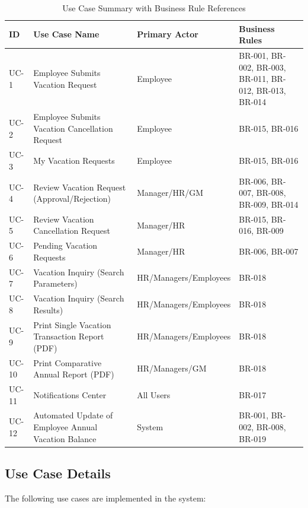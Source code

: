 \documentclass[12pt,a4paper]{article}
\begin{document}
\begin{table}[H]
\centering
\begin{tabular}{|p{1cm}|p{4cm}|p{3cm}|p{3cm}|}
\hline
\textbf{ID} & \textbf{Use Case Name} & \textbf{Primary Actor} & \textbf{Business Rules} \\
\hline
UC-1 & Employee Submits Vacation Request & Employee & BR-001, BR-002, BR-003, BR-011, BR-012, BR-013, BR-014 \\
\hline
UC-2 & Employee Submits Vacation Cancellation Request & Employee & BR-015, BR-016 \\
\hline
UC-3 & My Vacation Requests & Employee & BR-015, BR-016 \\
\hline
UC-4 & Review Vacation Request (Approval/Rejection) & Manager/HR/GM & BR-006, BR-007, BR-008, BR-009, BR-014 \\
\hline
UC-5 & Review Vacation Cancellation Request & Manager/HR & BR-015, BR-016, BR-009 \\
\hline
UC-6 & Pending Vacation Requests & Manager/HR & BR-006, BR-007 \\
\hline
UC-7 & Vacation Inquiry (Search Parameters) & HR/Managers/Employees & BR-018 \\
\hline
UC-8 & Vacation Inquiry (Search Results) & HR/Managers/Employees & BR-018 \\
\hline
UC-9 & Print Single Vacation Transaction Report (PDF) & HR/Managers/Employees & BR-018 \\
\hline
UC-10 & Print Comparative Annual Report (PDF) & HR/Managers/GM & BR-018 \\
\hline
UC-11 & Notifications Center & All Users & BR-017 \\
\hline
UC-12 & Automated Update of Employee Annual Vacation Balance & System & BR-001, BR-002, BR-008, BR-019 \\
\hline
\end{tabular}
\caption{Use Case Summary with Business Rule References}
\end{table}

\subsection{Use Case Details}
The following use cases are implemented in the system:
\end{document}
